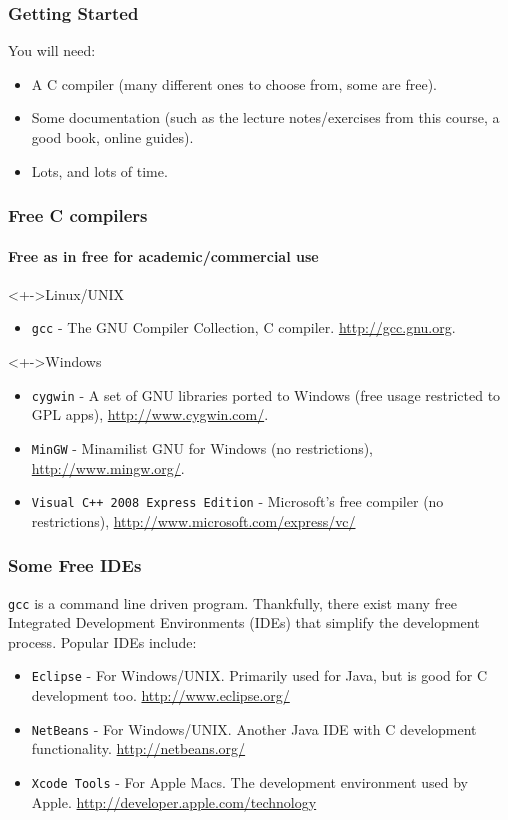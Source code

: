 \documentclass[table]{beamer}
\let\oldurl=\url
\renewcommand{\url}[1]{\textcolor{blue}{\oldurl{#1}}}
\begin{document}
\begin{frame}
\frametitle{Getting Started}
You will need:
\begin{itemize}
\item A C compiler (many different ones to choose from, some are free).
\item Some documentation (such as the lecture notes/exercises from this course,
a good book, online guides).
\item Lots, and lots of time.
\end{itemize}
\end{frame}

\begin{frame}
\frametitle{Free C compilers}
\framesubtitle{Free as in free for academic/commercial use}
\begin{block}<+->{Linux/UNIX}
\begin{itemize}
\item {\tt gcc} - The GNU Compiler Collection, C compiler.
\url{http://gcc.gnu.org}.
\end{itemize}
\end{block}
\begin{block}<+->{Windows}
\begin{itemize}
\item {\tt cygwin} - A set of GNU libraries ported to Windows (free usage
restricted to GPL apps),
\url{http://www.cygwin.com/}.
\item {\tt MinGW} - Minamilist GNU for Windows (no restrictions),
\url{http://www.mingw.org/}.
\item {\tt Visual C++ 2008 Express Edition} - Microsoft's free compiler (no restrictions),
\url{http://www.microsoft.com/express/vc/}
\end{itemize}
\end{block}
\end{frame}

\begin{frame}
\frametitle{Some Free IDEs}
{\tt gcc} is a command line driven program. Thankfully, there exist many free Integrated Development Environments (IDEs) that simplify the development process. Popular IDEs include:
\begin{block}{}
\begin{itemize}
\item {\tt Eclipse} - For Windows/UNIX. Primarily used for Java, but is good for C development too. \url{http://www.eclipse.org/}
\item {\tt NetBeans} - For Windows/UNIX. Another Java IDE with C development functionality. \url{http://netbeans.org/}
\item {\tt Xcode Tools} - For Apple Macs. The development environment used by Apple. \url{http://developer.apple.com/technology}
\end{itemize}
\end{block}
\end{frame}
\end{document}

